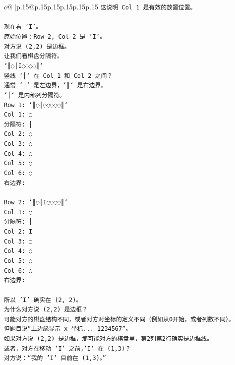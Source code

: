 \documentclass{article}
\begin{document}
{\begin{supertabular}{c@{$\;$}|p{.15\linewidth}@{}p{.15\linewidth}p{.15\linewidth}p{.15\linewidth}p{.15\linewidth}p{.15\linewidth}}
{{{\texttt{这说明 Col 1 是有效的放置位置。} \\
\\ 
\texttt{现在看 'I'。} \\
\texttt{原始位置：Row 2, Col 2 是 'I'。} \\
\texttt{对方说 (2,2) 是边框。} \\
\texttt{让我们看棋盘分隔符。} \\
\texttt{`║◌│I◌◌◌◌║`} \\
\texttt{竖线 `│` 在 Col 1 和 Col 2 之间？} \\
\texttt{通常 `║` 是左边界，`║` 是右边界。} \\
\texttt{`│` 是内部列分隔符。} \\
\texttt{Row 1: `║◌│◌◌◌◌◌║`} \\
\texttt{Col 1: ◌} \\
\texttt{分隔符: │} \\
\texttt{Col 2: ◌} \\
\texttt{Col 3: ◌} \\
\texttt{Col 4: ◌} \\
\texttt{Col 5: ◌} \\
\texttt{Col 6: ◌} \\
\texttt{右边界: ║} \\
\\ 
\texttt{Row 2: `║◌│I◌◌◌◌║`} \\
\texttt{Col 1: ◌} \\
\texttt{分隔符: │} \\
\texttt{Col 2: I} \\
\texttt{Col 3: ◌} \\
\texttt{Col 4: ◌} \\
\texttt{Col 5: ◌} \\
\texttt{Col 6: ◌} \\
\texttt{右边界: ║} \\
\\ 
\texttt{所以 'I' 确实在 (2, 2)。} \\
\texttt{为什么对方说 (2,2) 是边框？} \\
\texttt{可能对方的棋盘结构不同，或者对方对坐标的定义不同（例如从0开始，或者列数不同）。} \\
\texttt{但题目说“上边缘显示 x 坐标... 1234567”。} \\
\texttt{如果对方说 (2,2) 是边框，那可能对方的棋盘里，第2列第2行确实是边框线。} \\
\texttt{或者，对方在移动 'I' 之前，'I' 在 (1,3)？} \\
\texttt{对方说：“我的 'I' 目前在 (1,3)。”} \\
}}}
\end{supertabular}}
\end{document}
